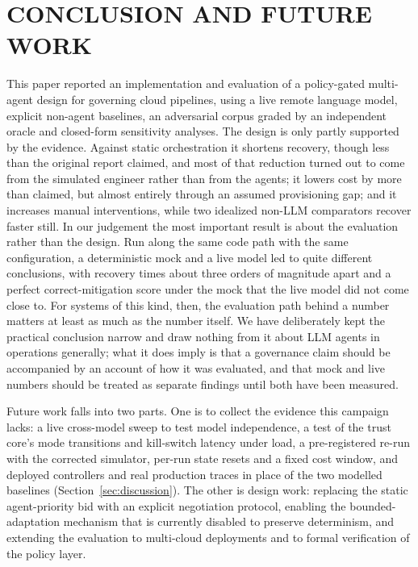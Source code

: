 \section{CONCLUSION AND FUTURE WORK}\label{sec:conclusion}

This paper reported an implementation and evaluation of a policy-gated multi-agent design for
governing cloud pipelines, using a live remote language model, explicit non-agent baselines, an
adversarial corpus graded by an independent oracle and closed-form sensitivity analyses. The design is
only partly supported by the evidence. Against static orchestration it shortens recovery, though less
than the original report claimed, and most of that reduction turned out to come from the simulated
engineer rather than from the agents; it lowers cost by more than claimed, but almost entirely through
an assumed provisioning gap; and it increases manual interventions, while two idealized non-LLM
comparators recover faster still. In our judgement the most important result is about the
evaluation rather than the design. Run along the same code path with the same configuration, a
deterministic mock and a live model led to quite different conclusions, with recovery times about
three orders of magnitude apart and a perfect correct-mitigation score under the mock that the live
model did not come close to. For systems of this kind, then, the evaluation path behind a number
matters at least as much as the number itself. We have deliberately kept the practical conclusion
narrow and draw nothing from it about LLM agents in operations generally; what it does imply is that a
governance claim should be accompanied by an account of how it was evaluated, and that mock and live
numbers should be treated as separate findings until both have been measured.

Future work falls into two parts. One is to collect the evidence this campaign lacks: a live
cross-model sweep to test model independence, a test of the trust core's mode transitions and
kill-switch latency under load, a pre-registered re-run with the corrected simulator, per-run state
resets and a fixed cost window, and deployed controllers and real production traces in place of the
two modelled baselines
(Section~\ref{sec:discussion}). The other is design work: replacing the
static agent-priority bid with an explicit negotiation protocol, enabling the bounded-adaptation
mechanism that is currently disabled to preserve determinism, and extending the evaluation to
multi-cloud deployments and to formal verification of the policy layer.

